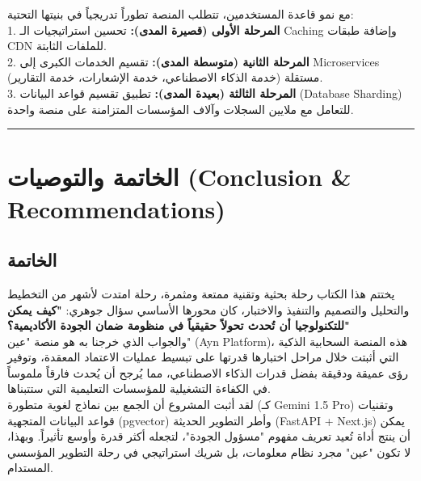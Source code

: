 \documentclass[12pt, a4paper]{report}
\begin{document}
\begin{english}
{مع نمو قاعدة المستخدمين، تتطلب المنصة تطوراً تدريجياً في بنيتها التحتية: \\

1. \textbf{المرحلة الأولى (قصيرة المدى):} تحسين استراتيجيات الـ Caching وإضافة طبقات CDN للملفات الثابتة. \\
2. \textbf{المرحلة الثانية (متوسطة المدى):} تقسيم الخدمات الكبرى إلى Microservices مستقلة (خدمة الذكاء الاصطناعي، خدمة الإشعارات، خدمة التقارير). \\
3. \textbf{المرحلة الثالثة (بعيدة المدى):} تطبيق تقسيم قواعد البيانات (Database Sharding) للتعامل مع ملايين السجلات وآلاف المؤسسات المتزامنة على منصة واحدة. \\

\vspace{0.5cm}\hrule\vspace{0.5cm}

\chapter*{الخاتمة والتوصيات (Conclusion & Recommendations)}

\section*{الخاتمة}

يختتم هذا الكتاب رحلة بحثية وتقنية ممتعة ومثمرة، رحلة امتدت لأشهر من التخطيط والتحليل والتصميم والتنفيذ والاختبار، كان محورها الأساسي سؤال جوهري: \textbf{"كيف يمكن للتكنولوجيا أن تُحدث تحولاً حقيقياً في منظومة ضمان الجودة الأكاديمية؟"} \\

والجواب الذي خرجنا به هو منصة "عين" (Ayn Platform)، هذه المنصة السحابية الذكية التي أثبتت خلال مراحل اختبارها قدرتها على تبسيط عمليات الاعتماد المعقدة، وتوفير رؤى عميقة ودقيقة بفضل قدرات الذكاء الاصطناعي، مما يُرجح أن يُحدث فارقاً ملموساً في الكفاءة التشغيلية للمؤسسات التعليمية التي ستتبناها. \\

لقد أثبت المشروع أن الجمع بين نماذج لغوية متطورة (كـ Gemini 1.5 Pro) وتقنيات قواعد البيانات المتجهية (pgvector) وأطر التطوير الحديثة (FastAPI + Next.js) يمكن أن ينتج أداة تُعيد تعريف مفهوم "مسؤول الجودة"، لتجعله أكثر قدرة وأوسع تأثيراً. وبهذا، لا تكون "عين" مجرد نظام معلومات، بل شريك استراتيجي في رحلة التطوير المؤسسي المستدام. \\

}
\end{english}
\end{document}
